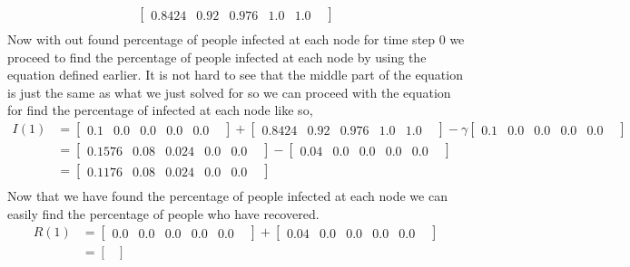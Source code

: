 \documentclass[11pt]{article}
\begin{document}
{\begin{enumerate}
\begin{align*}
\begin{bmatrix}
		0.8424    &
		0.92    	&
		0.976 	&
		1.0 		&
		1.0 		&
		\end{bmatrix}\\
\end{align*}
Now with out found percentage of people infected at each node for time step 0 we proceed to find the percentage of people infected at each node by using the equation defined earlier.  It is not hard to see that the middle part of the equation is just the same as what we just solved for so we can proceed with the equation for find the percentage of infected at each node like so,\\
\begin{align*}
	I(1) &=
		\begin{bmatrix} 
		0.1    	&
		0.0    	&
		0.0 		&
		0.0 		&
		0.0 		&
		\end{bmatrix}
		+
		\begin{bmatrix} 
		0.8424   	&
		0.92    	&
		0.976 	&
		1.0 		&
		1.0 		&
		\end{bmatrix}
		- \gamma
		\begin{bmatrix} 
		0.1    	&
		0.0    	&
		0.0 		&
		0.0 		&
		0.0 		&
		\end{bmatrix}\\
	      &=
		\begin{bmatrix} 
		0.1576    	&
		0.08    	&
		0.024	&
		0.0 		&
		0.0 		&
		\end{bmatrix}
		- 
		\begin{bmatrix} 
		0.04    	&
		0.0    	&
		0.0 		&
		0.0 		&
		0.0 		&
		\end{bmatrix}\\
	      &=
		\begin{bmatrix} 
		0.1176    	&
		0.08    	&
		0.024	&
		0.0 		&
		0.0 		&
		\end{bmatrix}\\
\end{align*}
Now that we have found the percentage of people infected at each node we can easily find the percentage of people who have recovered.\\
\begin{align*}
	R(1) &=
		\begin{bmatrix} 
		0.0    	&
		0.0    	&
		0.0 		&
		0.0 		&
		0.0 		&
		\end{bmatrix}
		+
		\begin{bmatrix} 
		0.04   	&
		0.0    	&
		0.0	 	&
		0.0 		&
		0.0 		&
		\end{bmatrix}\\
	      &=
		\begin{bmatrix} 

\end{bmatrix}
\end{align*}
\end{enumerate}}
\end{document}
